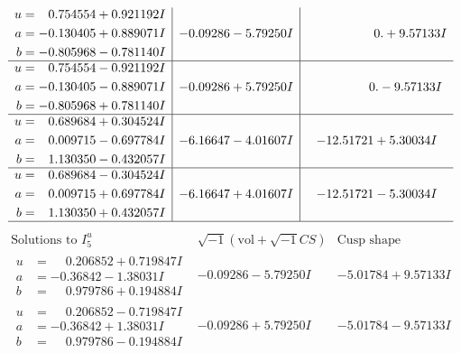 \documentclass[1p]{elsarticle_modified}
\theoremstyle{definition}
\newcommand{\I}{\sqrt{-1}}
\begin{document}
$$\begin{array}{c|c|c}
\begin{aligned}
u &= \phantom{-}0.754554 + 0.921192 I \\
a &= -0.130405 + 0.889071 I \\
b &= -0.805968 - 0.781140 I\end{aligned}
 & -0.09286 - 5.79250 I & \phantom{-0.000000 -}0. + 9.57133 I \\ \hline\begin{aligned}
u &= \phantom{-}0.754554 - 0.921192 I \\
a &= -0.130405 - 0.889071 I \\
b &= -0.805968 + 0.781140 I\end{aligned}
 & -0.09286 + 5.79250 I & \phantom{-0.000000 } 0. - 9.57133 I \\ \hline\begin{aligned}
u &= \phantom{-}0.689684 + 0.304524 I \\
a &= \phantom{-}0.009715 - 0.697784 I \\
b &= \phantom{-}1.130350 - 0.432057 I\end{aligned}
 & -6.16647 - 4.01607 I & -12.51721 + 5.30034 I \\ \hline\begin{aligned}
u &= \phantom{-}0.689684 - 0.304524 I \\
a &= \phantom{-}0.009715 + 0.697784 I \\
b &= \phantom{-}1.130350 + 0.432057 I\end{aligned}
 & -6.16647 + 4.01607 I & -12.51721 - 5.30034 I\\
 \hline 
 \end{array}$$\newpage$$\begin{array}{c|c|c}  
\text{Solutions to }I^u_{5}& \I (\text{vol} + \sqrt{-1}CS) & \text{Cusp shape}\\
 \hline 
\begin{aligned}
u &= \phantom{-}0.206852 + 0.719847 I \\
a &= -0.36842 - 1.38031 I \\
b &= \phantom{-}0.979786 + 0.194884 I\end{aligned}
 & -0.09286 - 5.79250 I & -5.01784 + 9.57133 I \\ \hline\begin{aligned}
u &= \phantom{-}0.206852 - 0.719847 I \\
a &= -0.36842 + 1.38031 I \\
b &= \phantom{-}0.979786 - 0.194884 I\end{aligned}
 & -0.09286 + 5.79250 I & -5.01784 - 9.57133 I \\ \hline\begin{aligned}

\end{aligned}
\end{array}$$
\end{document}
